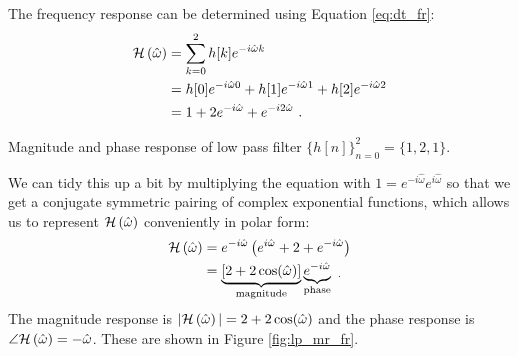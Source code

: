 The frequency response can be determined using Equation \ref{eq:dt_fr}:
\begin{align}
    \mathcal{H}\left(\hat{\omega}\right) & = \sum_{k=0}^{2} h[k] e^{-i\hat{\omega}k}                                     \\
        & = h[0]e^{-i\hat{\omega}0} + h[1]e^{-i\hat{\omega}1} + h[2]e^{-i\hat{\omega}2} \\
        & = 1 + 2 e^{-i\hat{\omega}} + e^{-i2\hat{\omega}} \,\,.
\end{align}
\begin{marginfigure}
    \begin{center}
    \end{center}
    \caption{Magnitude and phase response of low pass filter $\{h[n]\}_{n=0}^{2} = \{1,2,1\}$.}
    \label{fig:lp_mr_fr}
\end{marginfigure}
\noindent We can tidy this up a bit by multiplying the equation with
$1=e^{-i\hat{\omega}}e^{i\hat{\omega}}$ so that we get a conjugate
symmetric pairing of complex exponential functions, which allows us to
represent $\mathcal{H}\left(\hat{\omega}\right)$ conveniently in polar form:
\begin{align}
    \mathcal{H}\left(\hat{\omega}\right) & =  e^{-i\hat{\omega}}\left(e^{i\hat{\omega}} + 2 + e^{-i\hat{\omega}}\right)                                        \\
        & = \underbrace{[2+2\cos(\hat{\omega})]}_{\mathrm{magnitude}}\underbrace{e^{-i\hat{\omega}}}_{\mathrm{phase}} \,\, _.
\end{align}
The magnitude response is $|\mathcal{H}\left(\hat{\omega}\right)|=2+2\cos(\hat{\omega})$ and the phase
response is $\angle \mathcal{H}\left(\hat{\omega}\right) = -\hat{\omega}$. These are shown in
Figure \ref{fig:lp_mr_fr}.

